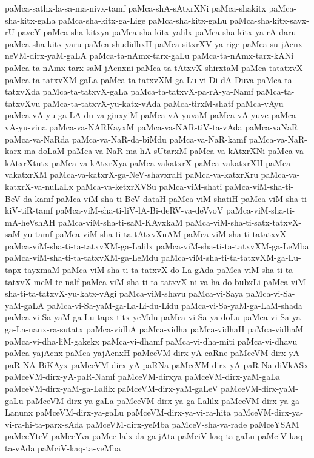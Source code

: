 {paMca-sathx-la-sa-ma-nivx-tamf
paMca-shA-sAtxrXNi
paMca-shakitx
paMca-sha-kitx-gaLa
paMca-sha-kitx-ga-Lige
paMca-sha-kitx-gaLu
paMca-sha-kitx-savx-rU-paveY
paMca-sha-kitxya
paMca-sha-kitx-yalilx
paMca-sha-kitx-ya-rA-daru
paMca-sha-kitx-yaru
paMca-shudidhxH
paMca-sitxrXV-ya-rige
paMca-su-jAcnx-neVM-dirx-yaM-gaLA
paMca-ta-nAmx-tarx-gaLu
paMca-ta-nAmx-tarx-kANi
paMca-ta-nAmx-tarx-saM-jAcnxni
paMca-ta-tAtxvX-shirxtaM
paMca-tatatxvX
paMca-ta-tatxvXM-gaLa
paMca-ta-tatxvXM-ga-Lu-vi-Di-dA-Duva
paMca-ta-tatxvXda
paMca-ta-tatxvX-gaLa
paMca-ta-tatxvX-pa-rA-ya-Namf
paMca-ta-tatxvXvu
paMca-ta-tatxvX-yu-katx-vAda
paMca-tirxM-shatf
paMca-vAyu
paMca-vA-yu-ga-LA-du-va-ginxyiM
paMca-vA-yuvaM
paMca-vA-yuve
paMca-vA-yu-vina
paMca-va-NARKayxM
paMca-va-NAR-tiV-ta-vAda
paMca-vaNaR
paMca-va-NaRda
paMca-va-NaR-da-biMdu
paMca-va-NaR-kamf
paMca-va-NaR-karx-ma-doLaM
paMca-va-NaR-ma-hA-sUtarxM
paMca-va-kAtxrXNi
paMca-va-kAtxrXtutx
paMca-va-kAtxrXya
paMca-vakatxrX
paMca-vakatxrXH
paMca-vakatxrXM
paMca-va-katxrX-ga-NeV-shavxraH
paMca-va-katxrXru
paMca-va-katxrX-va-nuLaLx
paMca-va-ketxrXVSu
paMca-viM-shati
paMca-viM-sha-ti-BeV-da-kamf
paMca-viM-sha-ti-BeV-dataH
paMca-viM-shatiH
paMca-viM-sha-ti-kiV-tiR-tamf
paMca-viM-sha-ti-liV-lA-Bi-deRV-va-deVvoV
paMca-viM-sha-ti-mA-heVshAH
paMca-viM-sha-ti-saM-KAyxkaM
paMca-viM-sha-ti-satx-tatxvX-saM-yu-tamf
paMca-viM-sha-ti-ta-tAtxvXnAM
paMca-viM-sha-ti-tatatxvX
paMca-viM-sha-ti-ta-tatxvXM-ga-Lalilx
paMca-viM-sha-ti-ta-tatxvXM-ga-LeMba
paMca-viM-sha-ti-ta-tatxvXM-ga-LeMdu
paMca-viM-sha-ti-ta-tatxvXM-ga-Lu-tapx-tayxmaM
paMca-viM-sha-ti-ta-tatxvX-do-La-gAda
paMca-viM-sha-ti-ta-tatxvX-meM-te-nalf
paMca-viM-sha-ti-ta-tatxvX-ni-va-ha-do-bubxLi
paMca-viM-sha-ti-ta-tatxvX-yu-katx-vAgi
paMca-viM-shavu
paMca-vi-Saya
paMca-vi-Sa-yaM-gaLA
paMca-vi-Sa-yaM-ga-La-Li-du-Lidu
paMca-vi-Sa-yaM-ga-LaM-shada
paMca-vi-Sa-yaM-ga-Lu-tapx-titx-yeMdu
paMca-vi-Sa-ya-doLu
paMca-vi-Sa-ya-ga-La-nanx-ra-sutatx
paMca-vidhA
paMca-vidha
paMca-vidhaH
paMca-vidhaM
paMca-vi-dha-liM-gakekx
paMca-vi-dhamf
paMca-vi-dha-miti
paMca-vi-dhavu
paMca-yajAcnx
paMca-yajAcnxH
paMceVM-dirx-yA-caRne
paMceVM-dirx-yA-paR-NA-BiKAyx
paMceVM-dirx-yA-paRNa
paMceVM-dirx-yA-paR-Na-diVkASx
paMceVM-dirx-yA-paR-Namf
paMceVM-dirxya
paMceVM-dirx-yaM-gaLa
paMceVM-dirx-yaM-ga-Lalilx
paMceVM-dirx-yaM-gaLeV
paMceVM-dirx-yaM-gaLu
paMceVM-dirx-ya-gaLa
paMceVM-dirx-ya-ga-Lalilx
paMceVM-dirx-ya-ga-Lanunx
paMceVM-dirx-ya-gaLu
paMceVM-dirx-ya-vi-ra-hita
paMceVM-dirx-ya-vi-ra-hi-ta-parx-sAda
paMceVM-dirx-yeMba
paMceV-sha-va-rade
paMceYSAM
paMceYteV
paMceYva
paMce-lalx-da-ga-jAta
paMciV-kaq-ta-gaLu
paMciV-kaq-ta-vAda
paMciV-kaq-ta-veMba
}
